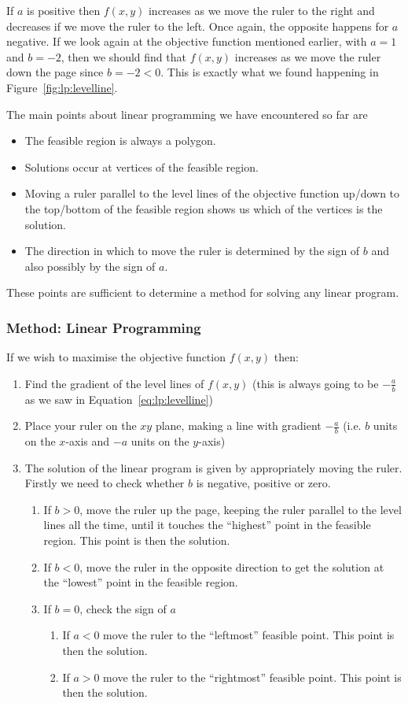 If $a$ is positive then $f(x,y)$ increases as we move the ruler to the right and decreases if we move the ruler to the left. Once again, the opposite happens for $a$ negative. If we look again at the objective function mentioned earlier,
with $a=1$ and $b=-2$, then we should find that $f(x,y)$ increases as we move the ruler down the page since $b=-2<0$. This is exactly what we found happening in Figure~\ref{fig:lp:levelline}.

The main points about linear programming we have encountered so far are
\begin{itemize}
\item The feasible region is always a polygon.
\item Solutions occur at vertices of the feasible region.
\item Moving a ruler parallel to the level lines of the objective function up/down to the top/bottom of the feasible region shows us which of the vertices is the solution.
\item The direction in which to move the ruler is determined by the sign of $b$ and also possibly by the sign of $a$.
\end{itemize}

These points are sufficient to determine a method for solving any linear program. 

\subsubsection{Method: Linear Programming}
If we wish to maximise the objective function $f(x,y)$ then:
\begin{enumerate}
\item Find the gradient of the level lines of $f(x,y)$ (this is always going to be $-\frac{a}{b}$ as we saw in Equation~\ref{eq:lp:levelline})
\item Place your ruler on the $xy$ plane, making a line with gradient $-\frac{a}{b}$ (i.e. $b$ units on the $x$-axis and $-a$ units on the $y$-axis)
\item The solution of the linear program is given by appropriately moving the ruler. Firstly we need to check whether $b$ is negative, positive or zero.
\begin{enumerate}
\item If $b>0$, move the ruler up the page, keeping the ruler parallel to the level lines all the time, until it touches the ``highest'' point in the feasible region. This point is then the solution.
\item If $b<0$, move the ruler in the opposite direction to get the solution at the ``lowest'' point in the feasible region.
\item If $b=0$, check the sign of $a$
\begin{enumerate}
\item If $a<0$ move the ruler to the ``leftmost'' feasible point. This point is then the solution.
\item If $a>0$ move the ruler to the ``rightmost'' feasible point. This point is then the solution.
\end{enumerate}
\end{enumerate}
\end{enumerate}

